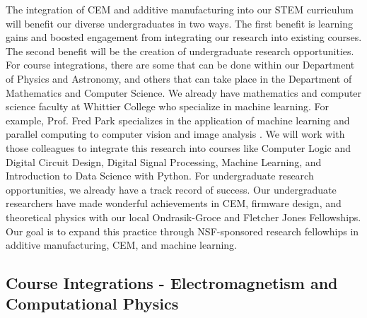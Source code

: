 \documentclass[../../main.tex]{subfiles}
\begin{document}
The integration of CEM and additive manufacturing into our STEM curriculum will benefit our diverse undergraduates in two ways.  The first benefit is learning gains and boosted engagement from integrating our research into existing courses.  The second benefit will be the creation of undergraduate research opportunities.  For course integrations, there are some that can be done within our Department of Physics and Astronomy, and others that can take place in the Department of Mathematics and Computer Science.  We already have mathematics and computer science faculty at Whittier College who specialize in machine learning.  For example, Prof. Fred Park specializes in the application of machine learning and parallel computing to computer vision and image analysis \cite{SHI201528,doi:10.1137/20M1337041}.  We will work with those colleagues to integrate this research into courses like Computer Logic and Digital Circuit Design, Digital Signal Processing, Machine Learning, and Introduction to Data Science with Python.  For undergraduate research opportunities, we already have a track record of success.  Our undergraduate researchers have made wonderful achievements in CEM, firmware design, and theoretical physics with our local Ondrasik-Groce and Fletcher Jones Fellowships.  Our goal is to expand this practice through NSF-sponsored research fellowhips in additive manufacturing, CEM, and machine learning. \\ \vspace{2.5mm}


\subsection{Course Integrations - Electromagnetism and Computational Physics}
\end{document}
